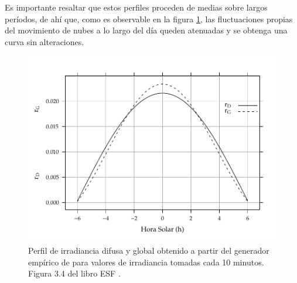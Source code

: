 Es importante resaltar que estos perfiles proceden de medias sobre largos períodos, de ahí que, como es observable en la figura \ref{fig:org42a109a}, las fluctuaciones propias del movimiento de nubes a lo largo del día queden atenuadas y se obtenga una curva sin alteraciones.
\begin{figure}[htbp]
\centering
\includegraphics[scale=0.85]{figuras/RgRd.pdf}
\caption{\label{fig:org42a109a}Perfil de irradiancia difusa y global obtenido a partir del generador empírico de \cite{Collares-Pereira.Rabl1979} para valores de irradiancia tomadas cada 10 minutos. Figura 3.4 del libro ESF \cite{Perpinan2023}.}
\end{figure}

\FloatBarrier
